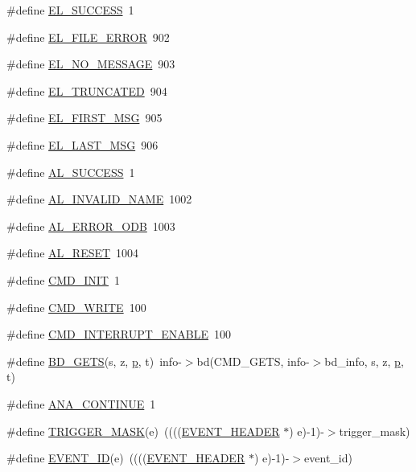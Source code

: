 \begin{DoxyCompactItemize}
\item 
\#define \hyperlink{group__err26_ga6d87830641fea1e7e72242c32acde1df}{EL\_\-SUCCESS}~1
\item 
\#define \hyperlink{group__err26_gae97067062620fe28d93670c390f23533}{EL\_\-FILE\_\-ERROR}~902
\item 
\#define \hyperlink{group__err26_ga92e31d92c7267ce163abeda53479cb0a}{EL\_\-NO\_\-MESSAGE}~903
\item 
\#define \hyperlink{group__err26_ga3e20cada0b5022911f56eb7c8b29b20b}{EL\_\-TRUNCATED}~904
\item 
\#define \hyperlink{group__err26_gaac4d08b2b3c0c6755a104864de2ec8f0}{EL\_\-FIRST\_\-MSG}~905
\item 
\#define \hyperlink{group__err26_ga5f11d9b4e829e2486252fef634b6a382}{EL\_\-LAST\_\-MSG}~906
\item 
\#define \hyperlink{group__err26_ga5bf38fa7fcb948150030918ced138deb}{AL\_\-SUCCESS}~1
\item 
\#define \hyperlink{group__err26_ga55849da05eeaa784af7a8b0969b6cab8}{AL\_\-INVALID\_\-NAME}~1002
\item 
\#define \hyperlink{group__err26_gae85455d8748ca9ad9c652365f4030178}{AL\_\-ERROR\_\-ODB}~1003
\item 
\#define \hyperlink{group__err26_ga6fb127cb253f60659e9356f9eeff2107}{AL\_\-RESET}~1004
\item 
\#define \hyperlink{group__err26_ga2677fc43f8393bcf3bafc8bbface003f}{CMD\_\-INIT}~1
\item 
\#define \hyperlink{group__err26_ga7391deb9c3a262ded3e186e94eb884e2}{CMD\_\-WRITE}~100
\item 
\#define \hyperlink{group__err26_gaab5043b2fd69a86d3bcecfb3fd8f7af3}{CMD\_\-INTERRUPT\_\-ENABLE}~100
\item 
\#define \hyperlink{group__err26_ga834400e6d1a88da1ea5e83b5e50675af}{BD\_\-GETS}(s, z, \hyperlink{sis3803_8c_afcb0609a0beab248bb3994a3368bd9ff}{p}, t)~info-\/$>$bd(CMD\_\-GETS, info-\/$>$bd\_\-info, s, z, \hyperlink{sis3803_8c_afcb0609a0beab248bb3994a3368bd9ff}{p}, t)
\item 
\#define \hyperlink{group__midasincludecode_ga5047333a47cabd84504052d921f5e82d}{ANA\_\-CONTINUE}~1
\item 
\#define \hyperlink{group__mbufferh_ga6a0d6be5b8aad5a907d5b880bae93eb9}{TRIGGER\_\-MASK}(e)~((((\hyperlink{structEVENT__HEADER}{EVENT\_\-HEADER} $\ast$) e)-\/1)-\/$>$trigger\_\-mask)
\item 
\#define \hyperlink{group__mbufferh_gaf42c9a1ac33cf459bfd366673f6a4d70}{EVENT\_\-ID}(e)~((((\hyperlink{structEVENT__HEADER}{EVENT\_\-HEADER} $\ast$) e)-\/1)-\/$>$event\_\-id)

\end{DoxyCompactItemize}
